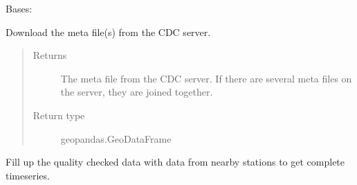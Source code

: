 \documentclass[letterpaper,10pt,english]{sphinxmanual}
\begin{document}
\begin{fulllineitems}
\label{\detokenize{weatherDB:weatherDB.stations.StationsBase}}
\sphinxAtStartPar
Bases: 

\begin{fulllineitems}
\label{\detokenize{weatherDB:weatherDB.stations.StationsBase.__init__}}
\end{fulllineitems}


\begin{fulllineitems}
\label{\detokenize{weatherDB:weatherDB.stations.StationsBase.download_meta}}
\sphinxAtStartPar
Download the meta file(s) from the CDC server.
\begin{quote}\begin{description}
\item[{Returns}] \leavevmode
\sphinxAtStartPar
The meta file from the CDC server.
If there are several meta files on the server, they are joined together.

\item[{Return type}] \leavevmode
\sphinxAtStartPar
geopandas.GeoDataFrame

\end{description}\end{quote}

\end{fulllineitems}


\begin{fulllineitems}
\label{\detokenize{weatherDB:weatherDB.stations.StationsBase.fillup}}
\sphinxAtStartPar
Fill up the quality checked data with data from nearby stations to get complete timeseries.


\end{fulllineitems}
\end{fulllineitems}
\end{document}
